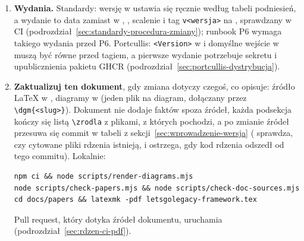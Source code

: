 \begin{enumerate}
        scalany, gdy każdy check na jego head commicie jest zielony; stosy scala się po
        kolei, commitami merge. Nikt nie przegląda PR przed scaleniem: checki --- testy,
        progi mutacyjne, job end-to-end, CodeQL, skan sekretów --- są przeglądem
        (zaakceptowane ryzyko A3).
  \item \textbf{Wydania.} Standardy: wersję w  ustawia się ręcznie
        według tabeli podniesień, a wydanie to data zamiast 
        w , , scalenie i tag \texttt{v<wersja>} na
        , sprawdzany w CI (podrozdział~\ref{sec:standardy-procedura-zmiany});
        runbook P6 wymaga takiego wydania przed P6. Portcullis: \texttt{<Version>}
        w  i domyślne wejście 
        w  muszą być równe przed tagiem, a pierwsze wydanie potrzebuje
        sekretu  i upublicznienia pakietu GHCR
        (podrozdział~\ref{sec:portcullis-dystrybucja}).
  \item \textbf{Zaktualizuj ten dokument}, gdy zmiana dotyczy czegoś, co opisuje: źródło
        LaTeX w , diagramy w  (jeden plik
         na diagram, dołączany przez \texttt{\textbackslash dgm\{<slug>\}}).
        Dokument nie dodaje faktów spoza źródeł, każda podsekcja kończy się listą
        \texttt{\textbackslash zrodla} z plikami, z których pochodzi, a po zmianie źródeł
        przesuwa się commit w tabeli z sekcji~\ref{sec:wprowadzenie-wersja}
        ( sprawdza, czy cytowane pliki rdzenia
        istnieją, i ostrzega, gdy kod rdzenia odszedł od tego commitu). Lokalnie:
\begin{lstlisting}
npm ci && node scripts/render-diagrams.mjs
node scripts/check-papers.mjs && node scripts/check-doc-sources.mjs
cd docs/papers && latexmk -pdf letsgolegacy-framework.tex
\end{lstlisting}
        Pull request, który dotyka źródeł dokumentu, uruchamia 
        (podrozdział~\ref{sec:rdzen-ci-pdf}).
\end{enumerate}

